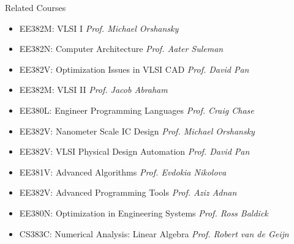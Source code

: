 
\begin{rSection}{Related Courses}

\begin{itemize}
\item EE382M:  VLSI  I  \hfill{\em Prof.  Michael  Orshansky}
\item EE382N:  Computer  Architecture  \hfill{\em Prof.  Aater  Suleman} 
\item EE382V:  Optimization  Issues  in  VLSI  CAD  \hfill{\em Prof.  David  Pan}
\item EE382M:  VLSI  II  \hfill{\em Prof.  Jacob  Abraham}
\item EE380L:  Engineer  Programming  Languages  \hfill{\em Prof.  Craig  Chase}
\item EE382V:  Nanometer  Scale  IC  Design  \hfill{\em Prof.  Michael  Orshansky}
\item EE382V:  VLSI  Physical  Design  Automation  \hfill{\em Prof.  David  Pan} 
\item EE381V:  Advanced  Algorithms  \hfill{\em Prof.  Evdokia  Nikolova}
\item EE382V:  Advanced  Programming  Tools  \hfill{\em Prof.  Aziz  Adnan}
\item EE380N:  Optimization in Engineering Systems  \hfill{\em Prof. Ross Baldick}
\item CS383C:  Numerical Analysis: Linear Algebra  \hfill{\em Prof. Robert van de Geijn}
\end{itemize}

\end{rSection}
